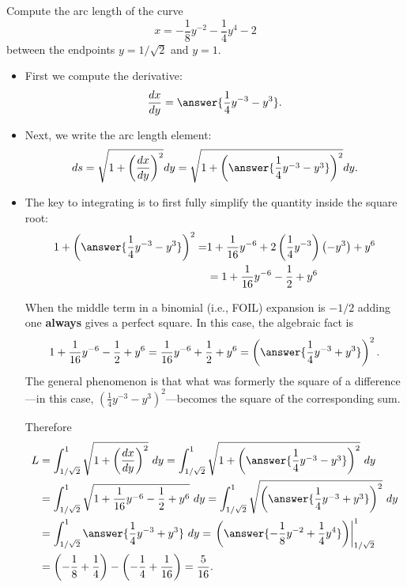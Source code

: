 \documentclass{ximera}
\begin{document}
\begin{example}%
Compute the arc length of the curve $$x = -\frac{1}{8}y^{-2} - \frac{1}{4}y^{4} - 2$$ between the endpoints $y = 1/\sqrt{2}$ and $y = 1$.
\begin{itemize}
\item First we compute the derivative: \[\frac{dx}{dy} = \answer{\frac{1}{4} y^{-3} - y^3}. \]
\item Next, we write the arc length element:
\[ ds = \sqrt{ 1 + \left(\frac{dx}{dy}\right)^2} dy = \sqrt{1 + \left( \answer{ \frac{1}{4} y^{-3} - y^3} \right)^2} dy. \]
\item The key to integrating is to first fully simplify the quantity inside the square root:
\[ \begin{aligned}
1 + \left( \answer{\frac{1}{4} y^{-3} - y^3} \right)^2 = & 1 + \frac{1}{16} y^{-6} + 2 \left( \frac{1}{4} y^{-3} \right) \left( - y^3 \right) + y^6 \\
& = 1 + \frac{1}{16} y^{-6} - \frac{1}{2} + y^6
\end{aligned} \]
\begin{observation}
When the middle term in a binomial (i.e., FOIL) expansion is $-1/2$ adding one \textbf{always} gives a perfect square. In this case, the algebraic fact is
\[  1 + \frac{1}{16} y^{-6} - \frac{1}{2} + y^6 =   \frac{1}{16} y^{-6} + \frac{1}{2} + y^6 = \left( \answer{\frac{1}{4} y^{-3} + y^3} \right)^2. \]
The general phenomenon is that what was formerly the square of a difference---in this case, $\left( \frac{1}{4} y^{-3} - y^3 \right)^2$---becomes the square of the corresponding sum.
\end{observation} 
Therefore
$$
\begin{aligned}
L & = \int_{1/\sqrt{2}}^{1} \sqrt{1 + \left( \frac{dx}{dy} \right)^2}~dy 
   = \int_{1/\sqrt{2}}^{1} \sqrt{1 + \left( \answer{\frac{1}{4}y^{-3} - y^{3}} \right)^2}~dy \\
  & = \int_{1/\sqrt{2}}^{1} \sqrt{1 + \frac{1}{16}y^{-6} - \frac{1}{2} + y^{6}} ~ dy 
   = \int_{1/\sqrt{2}}^{1} \sqrt{ \left( \answer{\frac{1}{4}y^{-3} + y^{3}} \right)^2} ~ dy \\
  & = \int_{1/\sqrt{2}}^{1} \answer{\frac{1}{4}y^{-3} + y^{3}} ~ dy 
   = \left.  \left( \answer{-\frac{1}{8}y^{-2} + \frac{1}{4}y^{4}} \right) \right|_{1/\sqrt{2}}^{1} \\
  & =  \left( -\frac{1}{8} + \frac{1}{4} \right) - \left( -\frac{1}{4} + \frac{1}{16} \right) 
   = \frac{5}{16}.
\end{aligned}
$$
\end{itemize}
\end{example}
\end{document}
